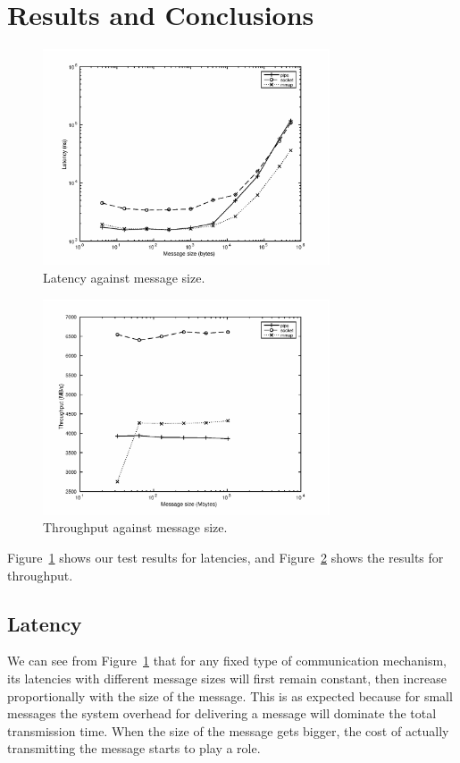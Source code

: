 \documentclass[11pt,conference]{IEEEtran}
\begin{document}
\section{Results and Conclusions}
\label{sec:results}
\begin{figure}
    \centering
    \includegraphics[width=8.5cm]{latency}
    \caption{Latency against message size.}
    \label{fig:1}
\end{figure}
\begin{figure}
    \centering
    \includegraphics[width=8.5cm]{throughput}
    \caption{Throughput against message size.}
    \label{fig:2}
\end{figure}
Figure~\ref{fig:1} shows our test results for latencies, and Figure~\ref{fig:2} shows the results for throughput.

\subsection{Latency}
We can see from Figure~\ref{fig:1} that for any fixed type of communication mechanism, its latencies with different message sizes will first remain constant, then increase proportionally with the size of the message.
This is as expected because for small messages the system overhead for delivering a message will dominate the total transmission time.
When the size of the message gets bigger, the cost of actually transmitting the message starts to play a role.
\end{document}
